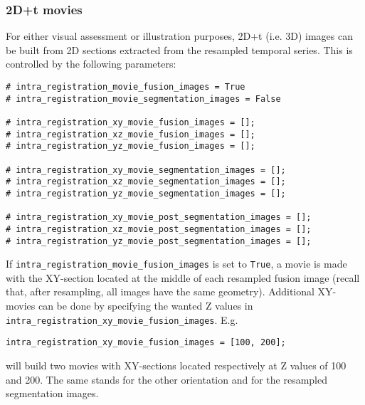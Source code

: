 \subsubsection{2D+t movies}
\label{sec:cli:intraregistration:movies}
For either visual assessment or illustration purposes, 2D+t (i.e. 3D) images can be built from 2D sections extracted from the resampled temporal series. This is controlled by the following parameters:
\begin{verbatim}
# intra_registration_movie_fusion_images = True
# intra_registration_movie_segmentation_images = False

# intra_registration_xy_movie_fusion_images = [];
# intra_registration_xz_movie_fusion_images = [];
# intra_registration_yz_movie_fusion_images = [];

# intra_registration_xy_movie_segmentation_images = [];
# intra_registration_xz_movie_segmentation_images = [];
# intra_registration_yz_movie_segmentation_images = [];

# intra_registration_xy_movie_post_segmentation_images = [];
# intra_registration_xz_movie_post_segmentation_images = [];
# intra_registration_yz_movie_post_segmentation_images = [];
\end{verbatim}

If \verb|intra_registration_movie_fusion_images| is set to \verb|True|, a movie is made with the  XY-section located at the middle of each resampled fusion image (recall that, after resampling, all images have the same geometry). Additional XY-movies can be done by specifying the wanted Z values in \verb|intra_registration_xy_movie_fusion_images|. E.g.
\begin{verbatim}
intra_registration_xy_movie_fusion_images = [100, 200];
\end{verbatim}
will build two movies with XY-sections located respectively at Z values of 100 and 200. The same stands for the other orientation and for the resampled segmentation images.

